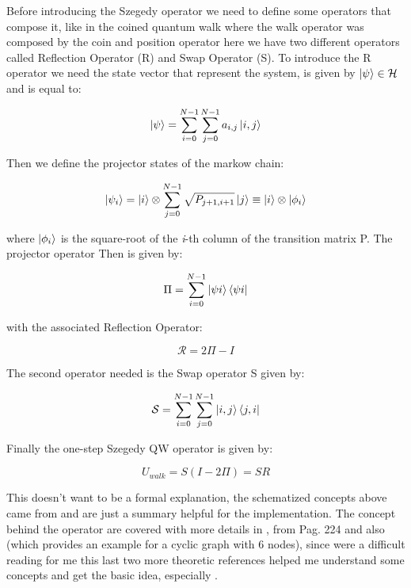 Before introducing the Szegedy operator we need to define some operators that compose it, like in the coined quantum walk where the 
walk operator was composed by the coin and position operator here we have two different operators called Reflection Operator (R) and Swap Operator (S). To introduce
the R operator we need the state vector that represent the system, is given by $\ket{\psi} \in \mathcal{H}$ and is equal to:

\begin{equation}
    \ket{\psi} = \sum_{i=0}^{N-1}\sum_{j=0}^{N-1} a_{i,j}\ket{i,j} 
\end{equation}

Then we define the projector states of the markow chain:

\begin{equation}
    \ket{\psi_{i}} = \ket{i} \otimes \sum_{j=0}^{N-1}\sqrt{P_{j+1,i+1}}\ket{j} \equiv \ket{i} \otimes \ket{\phi_{i}}
\end{equation}

where $\ket{\phi_{i}}$ is the square-root of the \textit{i}-th column of the transition matrix P. The projector operator Then is given by:

\begin{equation}
    \Pi = \sum_{i=0}^{N-1}\ket{\psi{i}}\bra{\psi{i}}
\end{equation}

with the associated Reflection Operator:

\begin{equation}
    \mathcal{R} = 2\Pi - I
\end{equation}

The second operator needed is the Swap operator S given by:

\begin{equation}
    \mathcal{S} = \sum_{i=0}^{N-1}\sum_{j=0}^{N-1} \ket{i,j}\bra{j,i} 
\end{equation}

Finally the one-step Szegedy QW operator is given by:

\begin{equation}
    U_{walk} = S(I - 2\varPi) = SR
\end{equation}

This doesn't want to be a formal explanation, the schematized concepts above came from \cite{Loke_2017} and are just a summary helpful for the implementation. 
The concept behind the operator are covered with more details in \cite{c2dacf48ddf341aca084f825d3787894, Loke_2017,1366222}, 
\cite{Portugal2018} from Pag. 224 and also \cite{Wong2017} (which provides an example for a cyclic graph with 6 nodes), since \cite{c2dacf48ddf341aca084f825d3787894, Loke_2017, 1366222}
were a difficult reading for me this last two more theoretic references helped me understand some concepts and get the basic idea, especially \cite{Wong2017}. 

